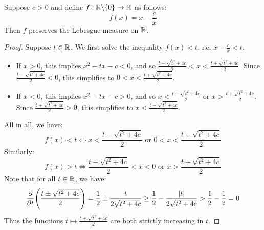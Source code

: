 \documentclass[main.tex]{subfiles}
\begin{document}
\begin{lemma}\label{cauchy_schlomilch_transformation}
    Suppose $c>0$ and define $f:\R\exc\{0\}\to\R$ as follows:
    \begin{equation*}
        f(x) = x-\frac{c}{x}
    \end{equation*}
    Then $f$ preserves the Lebesgue measure on $\R$.
\end{lemma}
\begin{proof}
    Suppose $t\in\R$. We first solve the inequality $f(x)<t$, i.e. $x-\frac{c}{x}<t$.
    \begin{itemize}
        \item If $x>0$, this implies $x^2-tx-c<0$, and so $\frac{t-\sqrt{t^2+4c}}{2}<x<\frac{t+\sqrt{t^2+4c}}{2}$. Since $\frac{t-\sqrt{t^2+4c}}{2}<0$, this simplifies to $0<x<\frac{t+\sqrt{t^2+4c}}{2}$.
        \item If $x<0$, this implies $x^2-tx-c>0$, and so $x<\frac{t-\sqrt{t^2+4c}}{2}$ or $x>\frac{t+\sqrt{t^2+4c}}{2}$. Since $\frac{t+\sqrt{t^2+4c}}{2}>0$, this simplifies to $x<\frac{t-\sqrt{t^2+4c}}{2}$.
    \end{itemize}
    All in all, we have:
    \begin{equation*}
        f(x)<t \iff x<\frac{t-\sqrt{t^2+4c}}{2} \text{ or } 0<x<\frac{t+\sqrt{t^2+4c}}{2}
    \end{equation*}
    Similarly:
    \begin{equation*}
        f(x)>t \iff \frac{t-\sqrt{t^2+4c}}{2}<x<0 \text{ or } x>\frac{t+\sqrt{t^2+4c}}{2}
    \end{equation*}
    Note that for all $t\in\R$, we have:
    \begin{equation*}
        \pdv{t}\qty(\frac{t\pm\sqrt{t^2+4c}}{2})
        = \frac{1}{2} \pm \frac{t}{2\sqrt{t^2+4c}}
        \ge \frac{1}{2} - \frac{\abs{t}}{2\sqrt{t^2+4c}}
        > \frac{1}{2}-\frac{1}{2}
        = 0
    \end{equation*}
    Thus the functions $t\mapsto\frac{t\pm\sqrt{t^2+4c}}{2}$ are both strictly increasing in $t$.
    

\end{proof}
\end{document}
